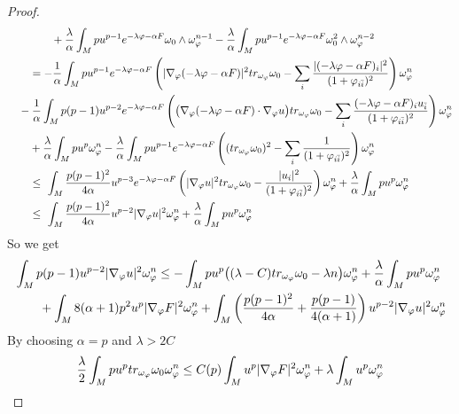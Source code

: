 \documentclass[11pt]{amsart}
\numberwithin{equation}{section}
\begin{document}
\begin{proof}
\begin{align}
	&\quad\quad\qquad +\frac{\lambda}{\alpha} \int_M pu^{p-1} e^{-\lambda\varphi-\alpha F}\omega_0\wedge\omega_\varphi^{n-1} - \frac{\lambda}{\alpha} \int_M pu^{p-1} e^{-\lambda\varphi-\alpha F} \omega_0^2 \wedge\omega_\varphi^{n-2} \notag\\
	&\qquad = -\frac{1}{\alpha} \int_M pu^{p-1} e^{-\lambda\varphi-\alpha F}\left( |\nabla_\varphi (-\lambda\varphi-\alpha F)|^2 tr_{\omega_{\varphi}}\omega_0 -\sum_i \frac{|(-\lambda\varphi-\alpha F)_i|^2}{(1+\varphi_{i\bar i})^2} \right)\omega_\varphi^{n} \notag\\
	&\quad -\frac{1}{\alpha} \int_M p(p-1)u^{p-2} e^{-\lambda\varphi-\alpha F} \left( \big( \nabla_\varphi (-\lambda\varphi-\alpha F)\cdot\nabla_\varphi u \big) tr_{\omega_{\varphi}}\omega_0 -\sum_i \frac{(-\lambda\varphi-\alpha F)_i u_{\bar i}}{(1+\varphi_{i\bar i})^2} \right) \omega_\varphi^{n} \notag\\
	&\quad\quad +\frac{\lambda}{\alpha}\int_M pu^p \omega_\varphi^n - \frac{\lambda}{\alpha} \int_M pu^{p-1} e^{-\lambda\varphi-\alpha F} \left( (tr_{\omega_{\varphi}}\omega_0)^2 -\sum_i \frac{1}{(1+\varphi_{i\bar i})^2} \right) \omega_\varphi^{n} \notag\\
	&\qquad \le  \ \int_M \frac{p(p-1)^2}{4\alpha} u^{p-3} e^{-\lambda\varphi-\alpha F} \left( |\nabla_\varphi u|^2 tr_{\omega_{\varphi}}\omega_0 - \frac{|u_i|^2}{(1+\varphi_{i\bar i})^2} \right)\omega_\varphi^n  +\frac{\lambda}{\alpha}\int_M pu^p \omega_\varphi^n \notag\\
	&\qquad \le  \ \int_M \frac{p(p-1)^2}{4\alpha} u^{p-2}  |\nabla_\varphi u|^2 \omega_\varphi^n  +\frac{\lambda}{\alpha}\int_M pu^p \omega_\varphi^n
\end{align}
So we get 
\begin{align}
	&\int_M p(p-1)u^{p-2}|\nabla_{\varphi}u|^2\omega_{\varphi}^n \le  -\int_M pu^p \big( (\lambda-C)tr_{\omega_{\varphi}}\omega_0-\lambda n\big) \omega_\varphi^n + \frac{\lambda}{\alpha}\int_M pu^p \omega_\varphi^n \notag\\
	&\quad\quad + \int_M 8(\alpha+1)p^2 u^p |\nabla_\varphi F|^2\omega_\varphi^n  + \int_M \left( \frac{p(p-1)^2}{4\alpha} + \frac{p(p-1)}{4(\alpha+1)}\right) u^{p-2}  |\nabla_\varphi u|^2 \omega_\varphi^n 
\end{align}
By choosing $\alpha=p$ and $\lambda>2C$ 
\begin{align}
	\frac{\lambda}{2} \int_M pu^p tr_{\omega_{\varphi}}\omega_0 \omega_\varphi^n \le  C(p) \int_M u^p |\nabla_\varphi F|^2 \omega_\varphi^n + \lambda \int_M u^p\omega_\varphi^n \notag\\ 

\end{align}
\end{proof}
\end{document}
